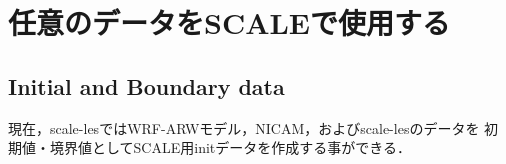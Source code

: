 \section{任意のデータをSCALEで使用する}





\subsection{Initial and Boundary data}
\label{sec:adv_bnddata}

現在，scale-lesではWRF-ARWモデル，NICAM，およびscale-lesのデータを
初期値・境界値としてSCALE用initデータを作成する事ができる．

